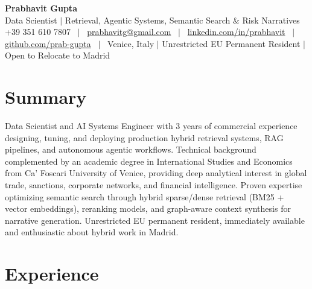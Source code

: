 \documentclass[a4paper,10pt]{article}
\begin{document}
\begin{minipage}[c]{0.80\textwidth}
  {\Huge\bfseries Prabhavit Gupta}\\[3pt]
  {\color{accent}\large Data Scientist $\vert$ Retrieval, Agentic Systems, Semantic Search \& Risk Narratives}\\[6pt]
  {\footnotesize +39 351 610 7807 ~$\vert$~
  \href{mailto:prabhavitg@gmail.com}{prabhavitg@gmail.com} ~$\vert$~
  \href{https://www.linkedin.com/in/prabhavit/}{linkedin.com/in/prabhavit} ~$\vert$~
  \href{https://github.com/prab-gupta}{github.com/prab-gupta} ~$\vert$~
  Venice, Italy $\vert$ Unrestricted EU Permanent Resident $\vert$ Open to Relocate to Madrid}
\end{minipage}\hfill

\section{Summary}
Data Scientist and AI Systems Engineer with 3 years of commercial experience designing, tuning, and deploying production hybrid retrieval systems, RAG pipelines, and autonomous agentic workflows. Technical background complemented by an academic degree in International Studies and Economics from Ca' Foscari University of Venice, providing deep analytical interest in global trade, sanctions, corporate networks, and financial intelligence. Proven expertise optimizing semantic search through hybrid sparse/dense retrieval (BM25 + vector embeddings), reranking models, and graph-aware context synthesis for narrative generation. Unrestricted EU permanent resident, immediately available and enthusiastic about hybrid work in Madrid.

\section{Experience}
\end{document}
